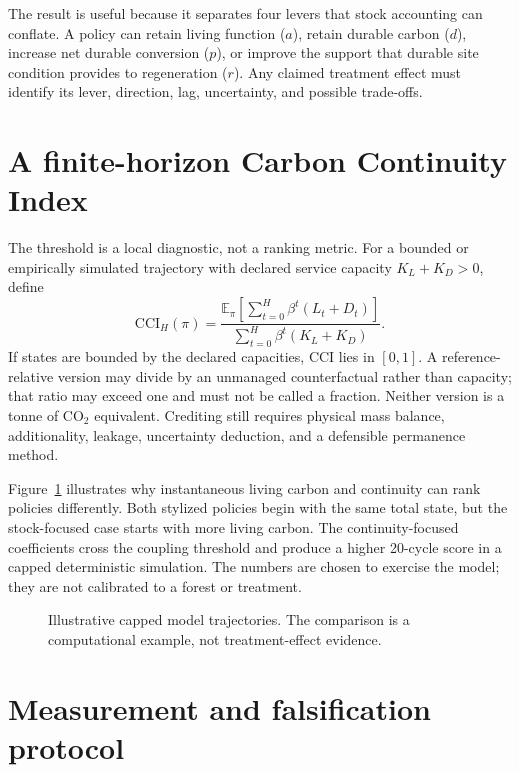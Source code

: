 \documentclass[10pt]{article}
\begin{document}
The result is useful because it separates four levers that stock accounting
can conflate.  A policy can retain living function ($a$), retain durable carbon
($d$), increase net durable conversion ($p$), or improve the support that
durable site condition provides to regeneration ($r$).  Any claimed treatment
effect must identify its lever, direction, lag, uncertainty, and possible
trade-offs.

\section{A finite-horizon Carbon Continuity Index}

The threshold is a local diagnostic, not a ranking metric.  For a bounded or
empirically simulated trajectory with declared service capacity
$K_L+K_D>0$, define
\begin{equation}
\mathrm{CCI}_{H}(\pi)=
\frac{\mathbb{E}_{\pi}\left[\sum_{t=0}^{H}\beta^t(L_t+D_t)\right]}
{\sum_{t=0}^{H}\beta^t(K_L+K_D)}.
\label{eq:cci}
\end{equation}
If states are bounded by the declared capacities, CCI lies in $[0,1]$.  A
reference-relative version may divide by an unmanaged counterfactual rather
than capacity; that ratio may exceed one and must not be called a fraction.
Neither version is a tonne of $\mathrm{CO}_2$ equivalent.  Crediting still
requires physical mass balance, additionality, leakage, uncertainty deduction,
and a defensible permanence method.

Figure~\ref{fig:trajectories} illustrates why instantaneous living carbon and
continuity can rank policies differently.  Both stylized policies begin with
the same total state, but the stock-focused case starts with more living carbon.
The continuity-focused coefficients cross the coupling threshold and produce a
higher 20-cycle score in a capped deterministic simulation.  The numbers are
chosen to exercise the model; they are not calibrated to a forest or treatment.

\begin{figure}[t]
\centering
\resizebox{0.78\linewidth}{!}{}
\caption{Illustrative capped model trajectories.  The comparison is a
computational example, not treatment-effect evidence.}
\label{fig:trajectories}
\end{figure}

\section{Measurement and falsification protocol}
\label{sec:tests}
\end{document}
